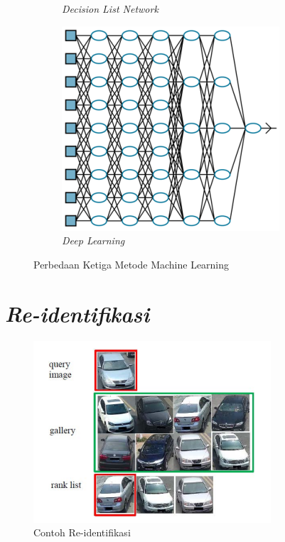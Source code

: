 \begin{figure}[h!]
\begin{subfigure}{.33\textwidth}
    \caption{\emph{Decision List Network}}
    \label{decisionlistnetwork}
  \end{subfigure}
  \begin{subfigure}{.33\textwidth}
    \centering
    \includegraphics[width=1\linewidth]{gambar/DeepLearning.png}
    \caption{\emph{Deep Learning}}
    \label{deeplearning}
  \end{subfigure}%
  \caption{Perbedaan Ketiga Metode Machine Learning}
  \label{fig:perbedaanketigametodemachinelearning}
\end{figure}

\section{\emph{Re-identifikasi}}
\label{sec:re-identifikasi}

\begin{figure}[ht]
  \centering
  \includegraphics[scale=1]{gambar/Contoh Re-identification.png}
  \caption{Contoh Re-identifikasi}
  \label{fig:contohreidentifikasi}
\end{figure}

